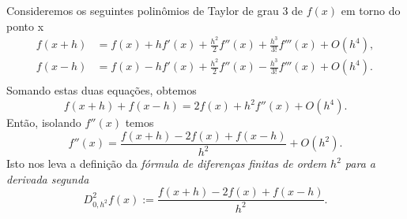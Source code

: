 Consideremos os seguintes polinômios de Taylor de grau 3 de $f(x)$ em torno do ponto x
\begin{align}
  f(x+h) &= f(x) + hf'(x) + \frac{h^2}{2}f''(x) + \frac{h^3}{3!}f'''(x) + O(h^4),\\
  f(x-h) &= f(x) - hf'(x) + \frac{h^2}{2}f''(x) - \frac{h^3}{3!}f'''(x) + O(h^4).\\
\end{align}
Somando estas duas equações, obtemos
\begin{equation}
  f(x+h)+f(x-h) = 2f(x) + h^2f''(x) + O(h^4).
\end{equation}
Então, isolando $f''(x)$ temos
\begin{equation}
  f''(x) = \frac{f(x+h) - 2f(x) + f(x-h)}{h^2} + O(h^2).
\end{equation}
Isto nos leva a definição da \emph{fórmula de diferenças finitas de ordem $h^2$ para a derivada segunda}
\begin{equation}
  D_{0,h^2}^2 f(x) := \frac{f(x+h) - 2f(x) + f(x-h)}{h^2}.
\end{equation}

